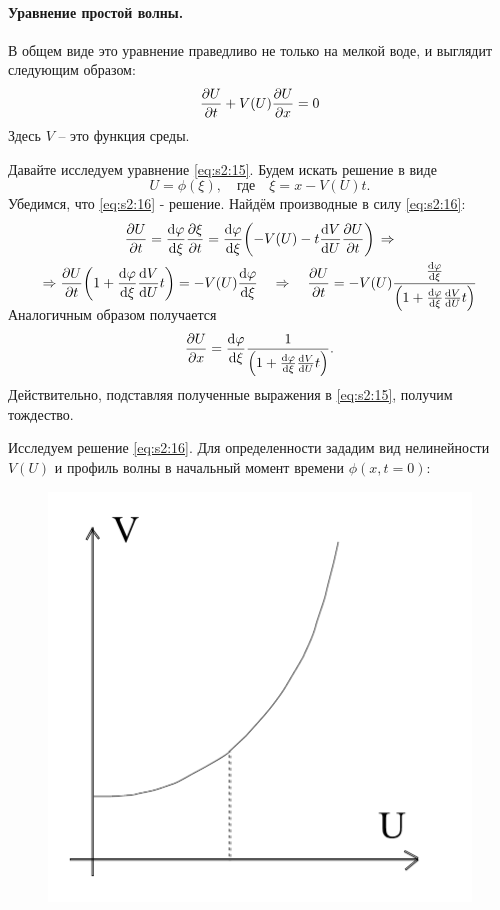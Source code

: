 \paragraph{Уравнение простой волны. } В общем виде это уравнение праведливо не только на мелкой воде, и выглядит следующим образом:
\begin{equation}
	\pdv{U}{t}+V(U)\pdv{U}{x} = 0
	\label{eq:s2:15}
\end{equation}
Здесь $V$ -- это функция среды. 

Давайте исследуем уравнение \eqref{eq:s2:15}. Будем искать решение в виде
\begin{equation}
	U = \phi(\xi), \quad \text{где}\quad
	\xi=x-V(U)t.
	\label{eq:s2:16}
\end{equation}
Убедимся, что \eqref{eq:s2:16} - решение. Найдём производные в силу \eqref{eq:s2:16}:
\begin{gather}
	\nonumber\pdv{U}{t}=\dv{\phi}{\xi}\pdv{\xi}{t}=\dv{\phi}{\xi}\qty(-V(U)-t\dv{V}{U}\pdv{U}{t})
	\,\Rightarrow \\ \Rightarrow 
	\pdv{U}{t}\qty(1+\dv{\phi}{\xi}\dv{V}{U}t)=-V(U)\dv{\phi}{\xi}
	\vspace{-0.5em}\quad \Rightarrow \vspace{-0.5em}\quad
	\pdv{U}{t}=-V(U)\frac{\dv{\phi}{\xi}}{\qty(1+\dv{\phi}{\xi}\dv{V}{U}t)}
	\label{eq:s2:6}
\end{gather}
Аналогичным образом получается
\begin{gather*}
	\pdv{U}{x}=\dv{\varphi}{\xi} \frac{1}{\qty(1+\dv{\varphi}{\xi}\dv{V}{U}t)}.
\end{gather*}
Действительно, подставляя полученные выражения в \eqref{eq:s2:15}, получим тождество.

Исследуем решение \eqref{eq:s2:16}. Для определенности зададим вид нелинейности $V(U)$ и профиль волны в начальный момент времени $\phi(x,t=0)$:
\begin{figure}[H]
	\centering
	\includegraphics[width=0.4\linewidth]{fig/fig12.pdf}   
\end{figure}

